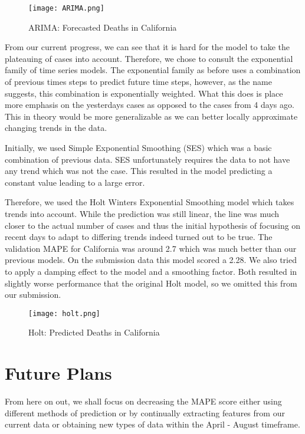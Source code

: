 \documentclass[sigconf,nonacm]{acmart}
\begin{document}
\begin{figure}
  \centering
  \texttt{[image: ARIMA.png]}
  \caption{ARIMA: Forecasted Deaths in California}
\end{figure}

From our current progress, we can see that it is hard for the model to take the
plateauing of cases into account. Therefore, we chose to consult the
exponential family of time series models. The exponential family as before uses
a combination of previous times steps to predict future time steps, however, as
the name suggests, this combination is exponentially weighted. What this does
is place more emphasis on the yesterdays cases as opposed to the cases from 4
days ago. This in theory would be more generalizable as we can better locally
approximate changing trends in the data. 

Initially, we used Simple Exponential Smoothing (SES) which was a basic
combination of previous data. SES unfortunately requires the data to not have
any trend which was not the case. This resulted in the model predicting a
constant value leading to a large error. 

Therefore, we used the Holt Winters Exponential Smoothing model which takes
trends into account. While the prediction was still linear, the line was much
closer to the actual number of cases and thus the initial hypothesis of
focusing on recent days to adapt to differing trends indeed turned out to be
true. The validation MAPE for California was around 2.7 which was much better
than our previous models. On the submission data this model scored a 2.28. We
also tried to apply a damping effect to the model and a smoothing factor. Both
resulted in slightly worse performance that the original Holt model, so we
omitted this from our submission.

\begin{figure}
  \centering
  \texttt{[image: holt.png]}
  \caption{Holt: Predicted Deaths in California}
\end{figure}

\section{Future Plans}

From here on out, we shall focus on decreasing the MAPE score either using
different methods of prediction or by continually extracting features from our
current data or obtaining new types of data within the April - August
timeframe.
\end{document}
